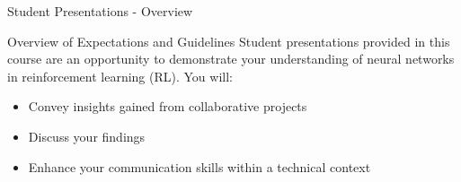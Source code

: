 \documentclass[aspectratio=169]{beamer}
\begin{document}
\begin{frame}[fragile]{Student Presentations - Overview}
    \begin{block}{Overview of Expectations and Guidelines}
        Student presentations provided in this course are an opportunity to demonstrate your understanding of neural networks in reinforcement learning (RL). You will:
        \begin{itemize}
            \item Convey insights gained from collaborative projects
            \item Discuss your findings
            \item Enhance your communication skills within a technical context
        \end{itemize}
    \end{block}
\end{frame}
\end{document}

